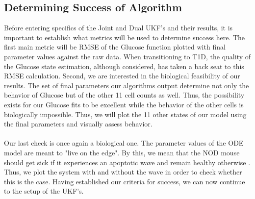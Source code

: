 \documentclass{article}
\begin{document}
\subsection{Determining Success of Algorithm}
Before entering specifics of the Joint and Dual UKF's and their results, it is important to establish what metrics will be used to determine success here. The first main metric will be RMSE of the Glucose function plotted with final parameter values against the raw data. When transitioning to T1D, the quality of the Glucose state estimation, although considered, has taken a back seat to this RMSE calculation. Second, we are interested in the biological feasibility of our results. The set of final parameters our algorithms output determine not only the behavior of Glucose but of the other 11 cell counts as well. Thus, the possibility exists for our Glucose fits to be excellent while the behavior of the other cells is biologically impossible. Thus, we will plot the 11 other states of our model using the final parameters and visually assess behavior. \\
\\
Our last check is once again a biological one. The parameter values of the ODE model are meant to "live on the edge". By this, we mean that the NOD mouse should get sick if it experiences an apoptotic wave and remain healthy otherwise \cite{shtylla2019mathematical}. Thus, we plot the system with and without the wave in order to check whether this is the case. Having established our criteria for success, we can now continue to the setup of the UKF's.
\end{document}
